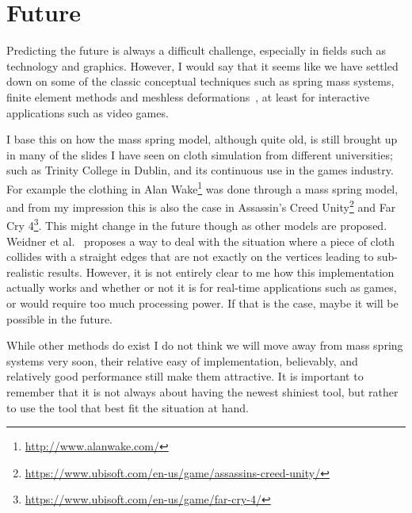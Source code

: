 \chapter{Future}
Predicting the future is always a difficult challenge, especially in fields such as technology and graphics.
However, I would say that it seems like we have settled down on some of the classic conceptual techniques such as spring mass systems, finite element methods and meshless deformations~\cite{muller2005meshless}, at least for interactive applications such as video games. 

I base this on how the mass spring model, although quite old, is still brought up in many of the slides I have seen on cloth simulation from different universities; such as Trinity College in Dublin\cite{mass_spring_cloth_trinity},
and its continuous use in the games industry.
For example the clothing in Alan Wake\footnote{\url{http://www.alanwake.com/}} was done through a mass spring model\cite{alan_wake_mass_spring}, and from my impression this is also the case
in Assassin's Creed Unity\footnote{\url{https://www.ubisoft.com/en-us/game/assassins-creed-unity/}} and Far Cry 4\footnote{\url{https://www.ubisoft.com/en-us/game/far-cry-4/}}\cite{ubisoft_cloth_simulation}.
This might change in the future though as other models are proposed. Weidner et al.~\cite{weidner_eol} proposes a way to deal with the situation where a piece of cloth collides with a straight edges that are not exactly on the vertices leading to sub-realistic results. 
However, it is not entirely clear to me how this implementation actually works and whether or not it is for real-time applications such as games, or would require too much processing power. 
If that is the case, maybe it will be possible in the future.

While other methods do exist I do not think we will move away from mass spring systems very soon, their relative easy of implementation, believably,
and relatively good performance still make them attractive.
It is important to remember that it is not always about having the newest shiniest tool, but rather to use the tool that best fit the situation at hand.






